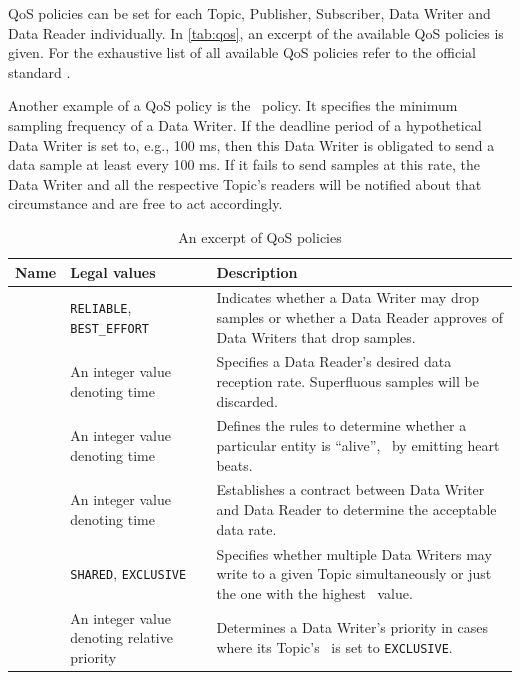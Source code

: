QoS policies can be set for each Topic, Publisher, Subscriber, Data Writer and Data Reader individually. 
In \autoref{tab:qos}, an excerpt of the available QoS policies is given. For the exhaustive list of all available QoS policies refer to the official standard \cite{dds-1.4-standard}.

Another example of a QoS policy is the \deadline\ policy. It specifies the minimum sampling frequency of a Data Writer. If the deadline period of a hypothetical Data Writer is set to, e.g., 100 ms, then this Data Writer is obligated to send a data sample at least every 100 ms. If it fails to send samples at this rate, the Data Writer and all the respective Topic's readers will be notified about that circumstance and are free to act accordingly.

\begin{table}[H]
  \caption[An excerpt of DDS QoS policies]{An excerpt of QoS policies}\label{tab:qos}
  \centering
  \begin{tabular}{p{} p{}  p{}}
    \toprule
      \textbf{Name} & \textbf{Legal values} & \textbf{Description} \\
    \midrule
    	\reliability  & \texttt{RELIABLE}, \texttt{BEST\_EFFORT} & Indicates whether a Data Writer may drop samples or whether a Data Reader approves of Data Writers that drop samples.\\
    	\tbf  & An integer value denoting time & Specifies a Data Reader's desired data reception rate. Superfluous samples will be discarded.\\
    	\liveliness  & An integer value denoting time & Defines the rules to determine whether a particular entity is ``alive'', \eg\ by emitting heart beats. \\
    	\deadline  & An integer value denoting time & Establishes a contract between Data Writer and Data Reader to determine the acceptable data rate. \\
    	\ownership  & \texttt{SHARED}, \texttt{EXCLUSIVE} & Specifies whether multiple Data Writers may write to a given Topic simultaneously or just the one with the highest \ostrength\  value.\\
    	\ostrength  & An integer value denoting relative priority & Determines a Data Writer's priority in cases where its Topic's \ownership\ is set to \texttt{EXCLUSIVE}. \\
    \bottomrule
  \end{tabular}
\end{table}

